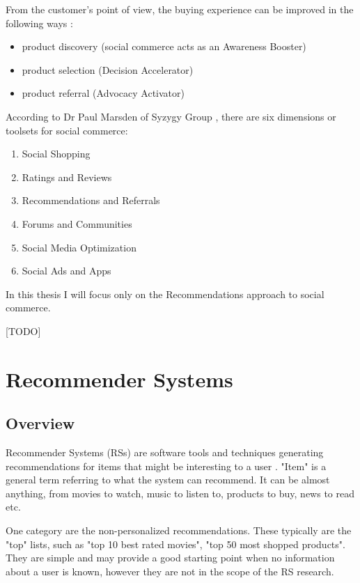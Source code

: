 \documentclass[12pt]{report}
\begin{document}
From the customer's point of view, the buying experience can be improved in the following ways \cite{social_commerce_syzygy}:
\begin{itemize}
\item product discovery (social commerce acts as an Awareness Booster)
\item product selection (Decision Accelerator)
\item product referral (Advocacy Activator)
\end{itemize}

According to Dr Paul Marsden of Syzygy Group \cite{social_commerce_syzygy}, there are six dimensions or toolsets for social commerce:
\begin{enumerate}
\item Social Shopping
\item Ratings and Reviews
\item Recommendations and Referrals
\item Forums and Communities
\item Social Media Optimization
\item Social Ads and Apps
\end{enumerate}

In this thesis I will focus only on the Recommendations approach to social commerce.

[TODO]

\section{Recommender Systems}

\subsection{Overview}

Recommender Systems (RSs) are software tools and techniques generating recommendations for items that might be interesting to a user \cite{rec_sys_handbook}. "Item" is a general term referring to what the system can recommend. It can be almost anything, from movies to watch, music to listen to, products to buy, news to read etc.

One category are the non-personalized recommendations. These typically are the "top" lists, such as "top 10 best rated movies", "top 50 most shopped products". They are simple and may provide a good starting point when no information about a user is known, however they are not in the scope of the RS research.
\end{document}
